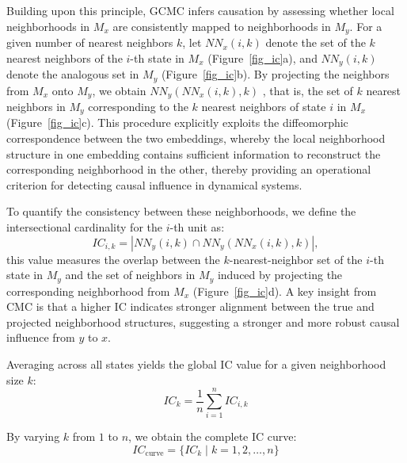 \documentclass[authoryear,preprint,review,12pt]{elsarticle}
\begin{document}
Building upon this principle, GCMC infers causation by assessing whether local neighborhoods in $M_x$ are consistently mapped to neighborhoods in $M_y$. For a given number of nearest neighbors \(k\), let \(\mathit{NN}_x(i,k)\) denote the set of the \(k\) nearest neighbors of the \(i\)-th state in \(M_x\) (Figure~\ref{fig_ic}a), and \(\mathit{NN}_y(i,k)\) denote the analogous set in \(M_y\) (Figure~\ref{fig_ic}b). By projecting the neighbors from \(M_x\) onto \(M_y\), we obtain \(\mathit{NN}_y(\mathit{NN}_x(i,k),k)\) , that is, the set of \(k\) nearest neighbors in \(M_y\) corresponding to the \(k\) nearest neighbors of state \(i\) in \(M_x\) (Figure~\ref{fig_ic}c). This procedure explicitly exploits the diffeomorphic correspondence between the two embeddings, whereby the local neighborhood structure in one embedding contains sufficient information to reconstruct the corresponding neighborhood in the other, thereby providing an operational criterion for detecting causal influence in dynamical systems.

To quantify the consistency between these neighborhoods, we define the intersectional cardinality for the $i$-th unit as:
\begin{equation}\label{eq-ic_ik}
IC_{i,k} = \left| \mathit{NN}_y(i,k) \cap \mathit{NN}_y(\mathit{NN}_x(i,k),k) \right|,
\end{equation}
\noindent this value measures the overlap between the $k$-nearest-neighbor set of the $i$-th state in $M_y$ and the set of neighbors in $M_y$ induced by projecting the corresponding neighborhood from $M_x$ (Figure~\ref{fig_ic}d). A key insight from CMC \citep{tao2023cmc} is that a higher IC indicates stronger alignment between the true and projected neighborhood structures, suggesting a stronger and more robust causal influence from $y$ to $x$.

Averaging across all states yields the global IC value for a given neighborhood size $k$:
\begin{equation}\label{eq-ic_k}
IC_k = \frac{1}{n} \sum_{i=1}^n IC_{i,k} 
\end{equation}

By varying $k$ from $1$ to $n$, we obtain the complete IC curve:
\begin{equation}\label{eq-ic_curve}
IC_{\text{curve}} = \{ IC_k \mid k = 1, 2, \dots, n \} 
\end{equation}
\end{document}
